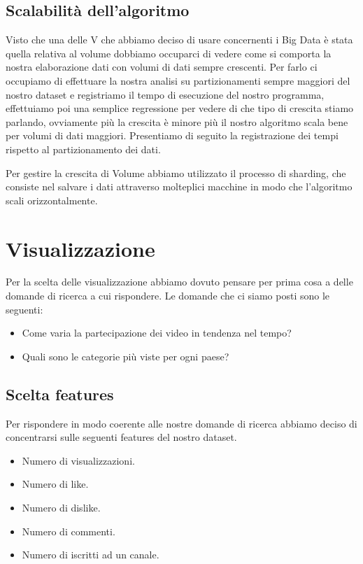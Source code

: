 \documentclass[10pt, a4paper,openany]{article}
\begin{document}
\subsection*{Scalabilità dell'algoritmo}

Visto che una delle V che abbiamo deciso di usare concernenti i Big Data è stata quella relativa al volume dobbiamo occuparci di vedere come si comporta la nostra elaborazione dati con volumi di dati sempre crescenti. Per farlo ci occupiamo di effettuare la nostra analisi su partizionamenti sempre maggiori del nostro dataset e registriamo il tempo di esecuzione del nostro programma, effettuiamo poi una semplice regressione per vedere di che tipo di crescita stiamo parlando, ovviamente più la crescita è minore più il nostro algoritmo scala bene per volumi di dati maggiori. Presentiamo di seguito la registrazione dei tempi rispetto al partizionamento dei dati. 

Per gestire la crescita di Volume abbiamo utilizzato il processo di sharding, che consiste nel salvare i dati attraverso molteplici macchine in modo che l'algoritmo scali orizzontalmente.
\section*{Visualizzazione}
Per la scelta delle visualizzazione abbiamo dovuto pensare per prima cosa a delle domande di ricerca a cui rispondere. Le domande che ci siamo posti sono le seguenti:
\begin{itemize}
	\item Come varia la partecipazione dei video in tendenza nel tempo?
	\item Quali sono le categorie più viste per ogni paese?
\end{itemize}

\subsection*{Scelta features}
Per rispondere in modo coerente alle nostre domande di ricerca abbiamo deciso di concentrarsi sulle seguenti features del nostro dataset.
\begin{itemize}
	\item Numero di visualizzazioni.
	\item Numero di like.
	\item Numero di dislike.
	\item Numero di commenti.
	\item Numero di iscritti ad un canale.
\end{itemize}
\end{document}
